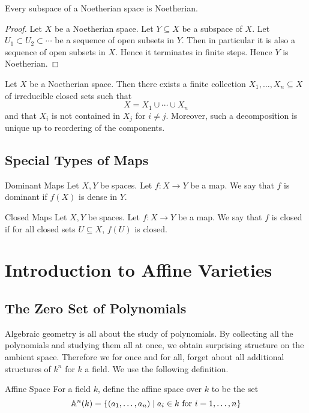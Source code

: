 \documentclass[a4paper]{article}
\begin{document}
\begin{prp}{}{} Every subspace of a Noetherian space is Noetherian. \tcbline
\begin{proof}
Let $X$ be a Noetherian space. Let $Y\subseteq X$ be a subspace of $X$. Let $U_1\subset U_2\subset\cdots$ be a sequence of open subsets in $Y$. Then in particular it is also a sequence of open subsets in $X$. Hence it terminates in finite steps. Hence $Y$ is Noetherian. 
\end{proof}
\end{prp}

\begin{prp}{}{} Let $X$ be a Noetherian space. Then there exists a finite collection $X_1,\dots,X_n\subseteq X$ of irreducible closed sets such that $$X=X_1\cup\cdots\cup X_n$$ and that $X_i$ is not contained in $X_j$ for $i\neq j$. Moreover, such a decomposition is unique up to reordering of the components. 
\end{prp}

\subsection{Special Types of Maps}
\begin{defn}{Dominant Maps}{} Let $X,Y$ be spaces. Let $f:X\to Y$ be a map. We say that $f$ is dominant if $f(X)$ is dense in $Y$. 
\end{defn}

\begin{defn}{Closed Maps}{} Let $X,Y$ be spaces. Let $f:X\to Y$ be a map. We say that $f$ is closed if for all closed sets $U\subseteq X$, $f(U)$ is closed. 
\end{defn}

\pagebreak
\section{Introduction to Affine Varieties}
\subsection{The Zero Set of Polynomials}
Algebraic geometry is all about the study of polynomials. By collecting all the polynomials and studying them all at once, we obtain surprising structure on the ambient space. Therefore we for once and for all, forget about all additional structures of $k^n$ for $k$ a field. We use the following definition. 

\begin{defn}{Affine Space}{} For a field $k$, define the affine space over $k$ to be the set $$\mathbb{A}^n(k)=\{(a_1,\dots,a_n)\;|\;a_i\in k\text{ for }i=1,\dots,n\}$$
\end{defn}
\end{document}
